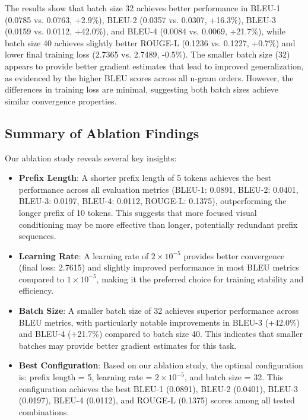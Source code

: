 \documentclass[runningheads]{llncs}
\begin{document}
The results show that batch size 32 achieves better performance in BLEU-1 (0.0785 vs. 0.0763, +2.9\%), BLEU-2 (0.0357 vs. 0.0307, +16.3\%), BLEU-3 (0.0159 vs. 0.0112, +42.0\%), and BLEU-4 (0.0084 vs. 0.0069, +21.7\%), while batch size 40 achieves slightly better ROUGE-L (0.1236 vs. 0.1227, +0.7\%) and lower final training loss (2.7365 vs. 2.7489, -0.5\%). The smaller batch size (32) appears to provide better gradient estimates that lead to improved generalization, as evidenced by the higher BLEU scores across all n-gram orders. However, the differences in training loss are minimal, suggesting both batch sizes achieve similar convergence properties.

\subsection{Summary of Ablation Findings}

Our ablation study reveals several key insights:

\begin{itemize}
\item \textbf{Prefix Length}: A shorter prefix length of 5 tokens achieves the best performance across all evaluation metrics (BLEU-1: 0.0891, BLEU-2: 0.0401, BLEU-3: 0.0197, BLEU-4: 0.0112, ROUGE-L: 0.1375), outperforming the longer prefix of 10 tokens. This suggests that more focused visual conditioning may be more effective than longer, potentially redundant prefix sequences.

\item \textbf{Learning Rate}: A learning rate of $2 \times 10^{-5}$ provides better convergence (final loss: 2.7615) and slightly improved performance in most BLEU metrics compared to $1 \times 10^{-5}$, making it the preferred choice for training stability and efficiency.

\item \textbf{Batch Size}: A smaller batch size of 32 achieves superior performance across BLEU metrics, with particularly notable improvements in BLEU-3 (+42.0\%) and BLEU-4 (+21.7\%) compared to batch size 40. This indicates that smaller batches may provide better gradient estimates for this task.

\item \textbf{Best Configuration}: Based on our ablation study, the optimal configuration is: prefix length = 5, learning rate = $2 \times 10^{-5}$, and batch size = 32. This configuration achieves the best BLEU-1 (0.0891), BLEU-2 (0.0401), BLEU-3 (0.0197), BLEU-4 (0.0112), and ROUGE-L (0.1375) scores among all tested combinations.
\end{itemize}
\end{document}
